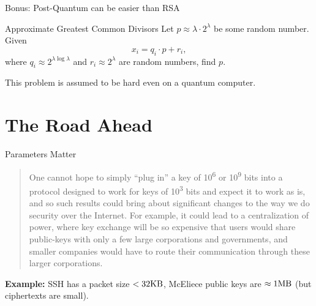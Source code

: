 \documentclass[xcolor=table,10pt,aspectratio=169]{beamer}
\begin{document}
\begin{frame}[label={sec:org598c30c}]{Bonus: Post-Quantum can be easier than RSA}
\begin{block}{Approximate Greatest Common Divisors}
Let \(p \approx \lambda \cdot 2^\lambda\) be some random number. Given \[x_i = q_i \cdot p + r_i,\] where \(q_i \approx 2^{\lambda \log \lambda}\) and \(r_i \approx 2^\lambda\) are random numbers, find \(p\).
\end{block}

This problem is assumed to be hard even on a quantum computer.
\end{frame}

\section{The Road Ahead}
\label{sec:org20f5c62}
\begin{frame}[label={sec:org9f29dc8}]{Parameters Matter}
\begin{quote}
One cannot hope to simply “plug in” a key of 10\textsuperscript{6} or 10\textsuperscript{9} bits into a protocol designed to work for keys of 10\textsuperscript{3} bits and expect it to work as is, and so such results could bring about significant changes to the way we do security over the Internet.  For example, it could lead to a centralization of power, where key exchange will be so expensive that users would share public-keys with only a few large corporations and governments, and smaller companies would have to route their communication through these larger corporations. 
\end{quote}

\pause

\textbf{Example:} SSH has a packet size \(< 32\textnormal{KB}\), McEliece public keys are \(\approx 1\textnormal{MB}\) (but ciphertexts are small).
\end{frame}
\end{document}
